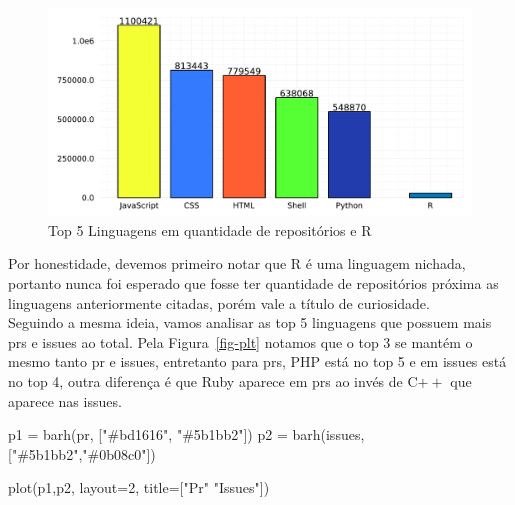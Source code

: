 \documentclass[
  letterpaper,
  DIV=11,
  numbers=noendperiod]{scrartcl}
\newenvironment{Shaded}{\begin{snugshade}}{\end{snugshade}}
\newcommand{\FloatTok}[1]{\textcolor[rgb]{0.68,0.00,0.00}{#1}}
\newcommand{\FunctionTok}[1]{\textcolor[rgb]{0.28,0.35,0.67}{#1}}
\newcommand{\NormalTok}[1]{\textcolor[rgb]{0.00,0.23,0.31}{#1}}
\newcommand{\OperatorTok}[1]{\textcolor[rgb]{0.37,0.37,0.37}{#1}}
\newcommand{\StringTok}[1]{\textcolor[rgb]{0.13,0.47,0.30}{#1}}
\begin{document}
\begin{figure}[H]

{\centering \includegraphics{report_files/figure-pdf/cell-3-output-1.pdf}

}

\caption{Top 5 Linguagens em quantidade de repositórios e R}

\end{figure}

Por honestidade, devemos primeiro notar que R é uma linguagem nichada,
portanto nunca foi esperado que fosse ter quantidade de repositórios
próxima as linguagens anteriormente citadas, porém vale a título de
curiosidade.\\
Seguindo a mesma ideia, vamos analisar as top 5 linguagens que possuem
mais prs e issues ao total. Pela Figura~\ref{fig-plt} notamos que o top
3 se mantém o mesmo tanto pr e issues, entretanto para prs, PHP está no
top 5 e em issues está no top 4, outra diferença é que Ruby aparece em
prs ao invés de C\(++\) que aparece nas issues.

\begin{Shaded}
\begin{Highlighting}[]
\NormalTok{p1 }\OperatorTok{=} \FunctionTok{barh}\NormalTok{(pr, [}\StringTok{"\#bd1616"}\NormalTok{, }\StringTok{"\#5b1bb2"}\NormalTok{])}
\NormalTok{p2 }\OperatorTok{=} \FunctionTok{barh}\NormalTok{(issues, [}\StringTok{"\#5b1bb2"}\NormalTok{,}\StringTok{"\#0b08c0"}\NormalTok{])}
           
\FunctionTok{plot}\NormalTok{(p1,p2, layout}\OperatorTok{=}\FloatTok{2}\NormalTok{, title}\OperatorTok{=}\NormalTok{[}\StringTok{"Pr"} \StringTok{"Issues"}\NormalTok{])}
\end{Highlighting}
\end{Shaded}
\end{document}
